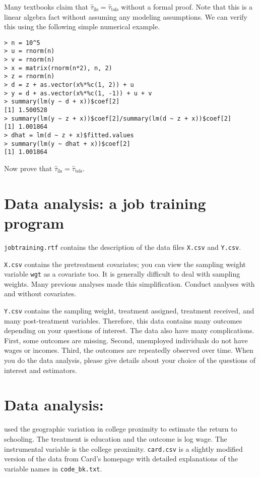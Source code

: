 \documentclass[11pt]{article}
\theoremstyle{definition}
\begin{document}
Many textbooks claim that $ \hat{\tau}_{\text{ils}}  = \hat{\tau}_{\text{tsls}}$ without a formal proof. Note that this is a linear algebra fact without assuming any modeling assumptions. We can verify this using the following simple numerical example. 


\begin{verbatim}
> n = 10^5
> u = rnorm(n)
> v = rnorm(n)
> x = matrix(rnorm(n*2), n, 2)
> z = rnorm(n)
> d = z + as.vector(x%*%c(1, 2)) + u
> y = d + as.vector(x%*%c(1, -1)) + u + v
> summary(lm(y ~ d + x))$coef[2]
[1] 1.500528
> summary(lm(y ~ z + x))$coef[2]/summary(lm(d ~ z + x))$coef[2]
[1] 1.001864
> dhat = lm(d ~ z + x)$fitted.values
> summary(lm(y ~ dhat + x))$coef[2]
[1] 1.001864
\end{verbatim}


Now prove that $ \hat{\tau}_{\text{ils}}  = \hat{\tau}_{\text{tsls}}$. 

 

\section{Data analysis: a job training program \citep{schochet2008does}}


\texttt{jobtraining.rtf} contains the description of the data files \texttt{X.csv} and \texttt{Y.csv}. 

\texttt{X.csv} contains the pretreatment covariates; you can view the sampling weight variable \texttt{wgt} as a covariate too. It is generally difficult to deal with sampling weights. Many previous analyses made this simplification. Conduct analyses with and without covariates. 

\texttt{Y.csv} contains the sampling weight, treatment assigned, treatment received, and many post-treatment variables. Therefore, this data contains many outcomes depending on your questions of interest. The data also have many complications. First, some outcomes are missing. Second, unemployed individuals do not have wages or incomes. Third, the outcomes are repeatedly observed over time. When you do the data analysis, please give details about your choice of the questions of interest and estimators. 


 
\section{Data analysis: \citet{card1993using}}

\citet{card1993using} used the geographic variation in college proximity to estimate the return to schooling. The treatment is education and the outcome is log wage. The instrumental variable is the college proximity. 
\texttt{card.csv} is a slightly modified version of the data from Card's homepage with detailed explanations of the variable names in \texttt{code\_bk.txt}.
\end{document}
